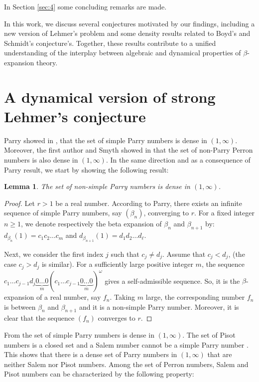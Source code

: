 \documentclass[12pt]{article}
\theoremstyle{plain}
\newtheorem{lemma}[theorem]{Lemma}
\theoremstyle{remark}
\begin{document}
In Section \ref{sec:4} some concluding remarks are made.

In this work, we discuss several conjectures motivated by our findings, including a new version of Lehmer’s problem and some density results related to Boyd's and Schmidt's conjecture's. Together, these results contribute to a unified understanding of the interplay between algebraic and dynamical properties of $\beta$-expansion theory.

\section{A dynamical version of strong Lehmer's conjecture}
\label{sec:1}

Parry showed in \cite{Par60}, that the set of simple Parry numbers is dense in $(1,\infty)$. Moreover, the first author and Smyth showed in \cite{HichriSmyth2024} that the set of non-Parry Perron numbers is also dense in $(1,\infty)$. In the same direction and as a consequence of Parry result, we start by showing the following result:
\begin{lemma} 
\label{parrydensity}
 The set of non-simple Parry numbers is dense in $(1,\infty)$. 
\end{lemma}
\begin{proof}
 Let $r>1$ be a real number.  According to Parry, there exists an infinite sequence of simple Parry numbers, say $(\beta_n)$, converging to $r$. For a fixed integer $n \geq 1$, we denote respectively the beta expansion of $\beta_n$ and $\beta_{n+1}$ by:
 $d_{\beta_n}(1)=c_1c_2\ldots c_m$ and $d_{\beta_{n+1}}(1)=d_1d_2\ldots d_{\ell}$.

Next, we consider the first index $j$ such that $c_j \neq d_j$.
Assume that $c_j<d_j$, (the case $c_j > d_j$ is similar). 
For a sufficiently large positive integer $m$, the sequence $c_1\dots c_{j-1} d_j \underbrace{0\dots0}_{m} (c_1\dots c_{j-1} \underbrace{0\dots0}_m)^{\omega}$
gives a self-admissible sequence. So, it is the $\beta$-expansion of a real number, say $f_n$. Taking $m$ large, the corresponding
number $f_n$ is between $\beta_n$ and $\beta_{n+1}$ and it is a non-simple Parry number.
Moreover, it is clear that the sequence $(f_n)$ converges to $r$.
\end{proof}

From \cite{Par60} the set of simple Parry numbers is dense in $(1,\infty)$.
The set of Pisot numbers is a closed set \cite{Sal63} and 
a Salem number cannot be a simple Parry number \cite{Boyd1989}.
This shows that there is a dense set of Parry numbers in $(1,\infty)$ that are neither Salem nor Pisot numbers. Among the set of Perron numbers, Salem and Pisot numbers can be characterized by the following property:
\end{document}
